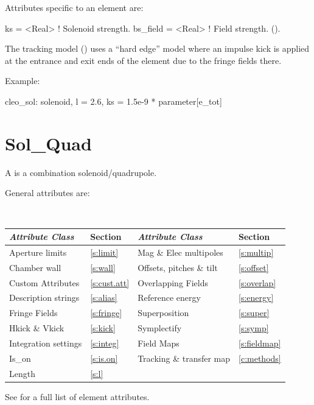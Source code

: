 {
Attributes specific to an  element are:
\begin{example}
  ks         = <Real>   ! Solenoid strength.
  bs_field   = <Real>   ! Field strength. ().
\end{example}

The  tracking model () uses a ``hard
edge'' model where an impulse kick is applied at the entrance and exit
ends of the element due to the fringe fields there.

Example:
\begin{example}
  cleo_sol: solenoid, l = 2.6, ks = 1.5e-9 * parameter[e_tot]
\end{example}

\section{Sol_Quad}
\label{s:sq}

A  is a combination solenoid/quadrupole.

General  attributes are:
\begin{center}
\tt
\begin{tabular}{llll} \toprule
  {\sl Attribute Class}      & Section           & {\sl Attribute Class}      & Section            \\ \midrule
  Aperture limits            & \ref{s:limit}     & Mag \& Elec multipoles     & \ref{s:multip}     \\
  Chamber wall               & \ref{s:wall}      & Offsets, pitches \& tilt   & \ref{s:offset}     \\
  Custom Attributes          & \ref{s:cust.att}  & Overlapping Fields         & \ref{s:overlap}    \\
  Description strings        & \ref{s:alias}     & Reference energy           & \ref{s:energy}     \\ 
  Fringe Fields              & \ref{s:fringe}    & Superposition              & \ref{s:super}      \\
  Hkick \& Vkick             & \ref{s:kick}      & Symplectify                & \ref{s:symp}       \\
  Integration settings       & \ref{s:integ}     & Field Maps                 & \ref{s:fieldmap}   \\
  Is_on                      & \ref{s:is.on}     & Tracking \& transfer map   & \ref{c:methods}    \\ 
  Length                     & \ref{s:l}         &                            &                    \\ 
  \bottomrule
\end{tabular}
\end{center}
\toffset
See  for a full list of element attributes.

}
